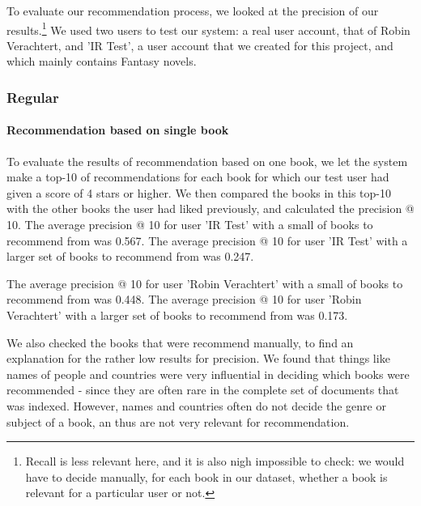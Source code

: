 \documentclass[10pt,a4paper]{paper}
\begin{document}
To evaluate our recommendation process, we looked at the precision of our results.\footnote{Recall is less relevant here, and it is also nigh impossible to check: we would have to decide manually, for each book in our dataset, whether a book is relevant for a particular user or not.} We used two users to test our system: a real user account, that of Robin Verachtert, and 'IR Test', a user account that we created for this project, and which mainly contains Fantasy novels.

\subsubsection{Regular}

\paragraph{Recommendation based on single book}
To evaluate the results of recommendation based on one book, we let the system make a top-10 of recommendations for each book for which our test user had given a score of 4 stars or higher. We then compared the books in this top-10 with the other books the user had liked previously, and calculated the precision @ 10.
The average precision @ 10 for user 'IR Test' with a small of books to recommend from was 0.567. 
The average precision @ 10 for user 'IR Test' with a larger set of books to recommend from was 0.247.

The average precision @ 10 for user 'Robin Verachtert' with a small of books to recommend from was 0.448. 
The average precision @ 10 for user 'Robin Verachtert' with a larger set of books to recommend from was 0.173.

We also checked the books that were recommend manually, to find an explanation for the rather low results for precision. We found that things like names of people and countries were very influential in deciding which books were recommended - since they are often rare in the complete set of documents that was indexed. However, names and countries often do not decide the genre or subject of a book, an thus are not very relevant for recommendation. 
\end{document}
